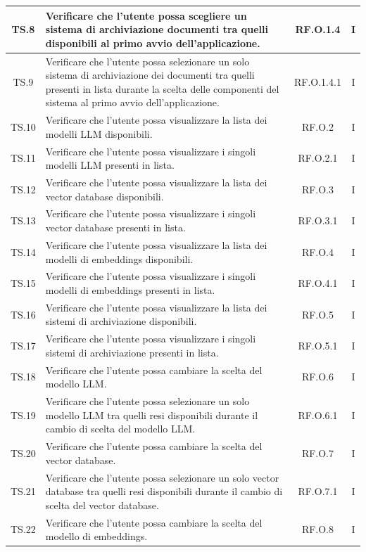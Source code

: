 \documentclass[10pt, a4paper]{article}
\begin{document}
\begin{xltabular}{\textwidth}{|c|X|c|c|}
\hline
TS.8 & Verificare che l'utente possa scegliere un sistema di archiviazione documenti tra quelli disponibili al primo avvio dell'applicazione. & RF.O.1.4 & I \\
\hline
TS.9 & Verificare che l'utente possa selezionare un solo sistema di archiviazione dei documenti tra quelli presenti in lista durante la scelta delle componenti del sistema al primo avvio dell'applicazione. & RF.O.1.4.1 & I \\
\hline
TS.10 & Verificare che l'utente possa visualizzare la lista dei modelli LLM disponibili. & RF.O.2 & I \\
\hline
TS.11 & Verificare che l'utente possa visualizzare i singoli modelli LLM presenti in lista. & RF.O.2.1 & I \\
\hline
TS.12 & Verificare che l'utente possa visualizzare la lista dei vector database disponibili. & RF.O.3 & I \\
\hline
TS.13 & Verificare che l'utente possa visualizzare i singoli vector database presenti in lista. & RF.O.3.1 & I \\
\hline
TS.14 & Verificare che l'utente possa visualizzare la lista dei modelli di embeddings disponibili. & RF.O.4 & I \\
\hline
TS.15 & Verificare che l'utente possa visualizzare i singoli modelli di embeddings presenti in lista. & RF.O.4.1 & I \\
\hline
TS.16 & Verificare che l'utente possa visualizzare la lista dei sistemi di archiviazione disponibili. & RF.O.5 & I \\
\hline
TS.17 & Verificare che l'utente possa visualizzare i singoli sistemi di archiviazione presenti in lista. & RF.O.5.1 & I \\
\hline
TS.18 & Verificare che l'utente possa cambiare la scelta del modello LLM. & RF.O.6 & I \\
\hline
TS.19 & Verificare che l'utente possa selezionare un solo modello LLM tra quelli resi disponibili durante il cambio di scelta del modello LLM. & RF.O.6.1 & I \\
\hline
TS.20 & Verificare che l'utente possa cambiare la scelta del vector database. & RF.O.7 & I \\
\hline
TS.21 & Verificare che l'utente possa selezionare un solo vector database tra quelli resi disponibili durante il cambio di scelta del vector database. & RF.O.7.1 & I \\
\hline
TS.22 & Verificare che l'utente possa cambiare la scelta del modello di embeddings. & RF.O.8 & I \\

\end{xltabular}
\end{document}
